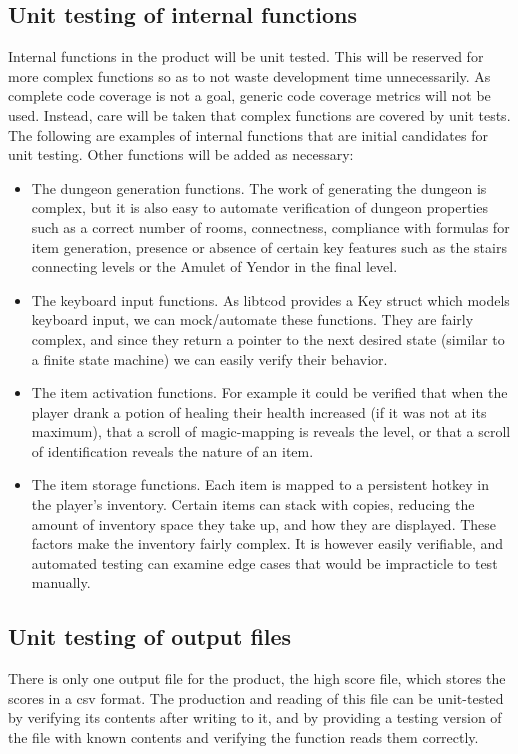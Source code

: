 \documentclass[12pt, titlepage]{article}
\begin{document}
	\subsection{Unit testing of internal functions}
		Internal functions in the product will be unit tested. This will be reserved for more complex functions so as to not waste development time unnecessarily. As complete code coverage is not a goal, generic code coverage metrics will not be used. Instead, care will be taken that complex functions are covered by unit tests. The following are examples of internal functions that are initial candidates for unit testing. Other functions will be added as necessary:
		\begin{itemize}
			\item The dungeon generation functions. The work of generating the dungeon is complex, but it is also easy to automate verification of dungeon properties such as a correct number of rooms, connectness, compliance with formulas for item generation, presence or absence of certain key features such as the stairs connecting levels or the Amulet of Yendor in the final level.
			\item The keyboard input functions. As libtcod provides a Key struct which models keyboard input, we can mock/automate these functions. They are fairly complex, and since they return a pointer to the next desired state (similar to a finite state machine) we can easily verify their behavior.
			\item The item activation functions. For example it could be verified that when the player drank a potion of healing their health increased (if it was not at its maximum), that a scroll of magic-mapping is reveals the level, or that a scroll of identification reveals the nature of an item.
			\item The item storage functions. Each item is mapped to a persistent hotkey in the player's inventory. Certain items can stack with copies, reducing the amount of inventory space they take up, and how they are displayed. These factors make the inventory fairly complex. It is however easily verifiable, and automated testing can examine edge cases that would be impracticle to test manually.
		\end{itemize}

	\subsection{Unit testing of output files}
		There is only one output file for the product, the high score file, which stores the scores in a csv format. The production and reading of this file can be unit-tested by verifying its contents after writing to it, and by providing a testing version of the file with known contents and verifying the function reads them correctly.
\end{document}
